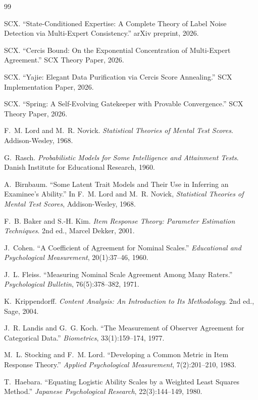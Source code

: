\documentclass[12pt,a4paper]{article}
\theoremstyle{remark}
\begin{document}

\begin{thebibliography}{99}

SCX. ``State-Conditioned Expertise: A Complete Theory of Label Noise Detection via Multi-Expert Consistency.'' arXiv preprint, 2026.

SCX. ``Cercis Bound: On the Exponential Concentration of Multi-Expert Agreement.'' SCX Theory Paper, 2026.

SCX. ``Yajie: Elegant Data Purification via Cercis Score Annealing.'' SCX Implementation Paper, 2026.

SCX. ``Spring: A Self-Evolving Gatekeeper with Provable Convergence.'' SCX Theory Paper, 2026.

F.~M. Lord and M.~R. Novick. \emph{Statistical Theories of Mental Test Scores}. Addison-Wesley, 1968.

G.~Rasch. \emph{Probabilistic Models for Some Intelligence and Attainment Tests}. Danish Institute for Educational Research, 1960.

A.~Birnbaum. ``Some Latent Trait Models and Their Use in Inferring an Examinee's Ability.'' In F.~M. Lord and M.~R. Novick, \emph{Statistical Theories of Mental Test Scores}, Addison-Wesley, 1968.

F.~B. Baker and S.-H. Kim. \emph{Item Response Theory: Parameter Estimation Techniques}. 2nd ed., Marcel Dekker, 2001.

J.~Cohen. ``A Coefficient of Agreement for Nominal Scales.'' \emph{Educational and Psychological Measurement}, 20(1):37--46, 1960.

J.~L. Fleiss. ``Measuring Nominal Scale Agreement Among Many Raters.'' \emph{Psychological Bulletin}, 76(5):378--382, 1971.

K.~Krippendorff. \emph{Content Analysis: An Introduction to Its Methodology}. 2nd ed., Sage, 2004.

J.~R. Landis and G.~G. Koch. ``The Measurement of Observer Agreement for Categorical Data.'' \emph{Biometrics}, 33(1):159--174, 1977.

M.~L. Stocking and F.~M. Lord. ``Developing a Common Metric in Item Response Theory.'' \emph{Applied Psychological Measurement}, 7(2):201--210, 1983.

T.~Haebara. ``Equating Logistic Ability Scales by a Weighted Least Squares Method.'' \emph{Japanese Psychological Research}, 22(3):144--149, 1980.


\end{thebibliography}
\end{document}
